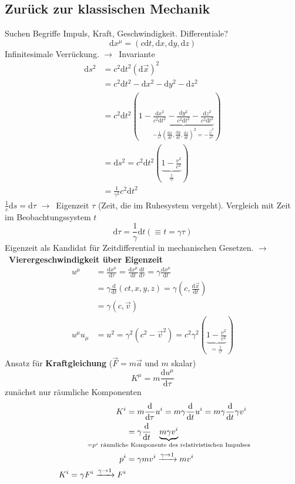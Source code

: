 \documentclass[oneside]{book}
\theoremstyle{definition}
\newcommand{\conseq}{$\rightarrow$~}
\renewcommand{\d}{\mathrm d}
\newcommand{\dd}[1]{\frac{\d}{\d #1}}
\newcommand{\ddd}[2]{\frac{\d #1}{\d #2}}
\begin{document}
\subsection{Zurück zur klassischen Mechanik}
Suchen Begriffe Impuls, Kraft, Geschwindigkeit. Differentiale?
$$\d x^\mu = (c \d t, \d x, \d y, \d z)$$
Infinitesimale Verrückung.
\conseq Invariante
\begin{align*}
 \d s^2  &= c^2 \d t^2 (\d \vec{x})^2\\
 & = c^2 \d t^2 - \d x^2 - \d y^2 - \d z^2\\
 & = c^2 \d t^2 (1 - \underbrace{\frac{\d x^2}{c^2 \d t^2} - \frac{\d y^2}{c^2 \d t^2} - \frac{\d z^2}{c^2 \d t^2}}_{- \frac{1}{c^2} (\ddd x t, \ddd y t, \ddd z t)^2 = - \frac{\vec{v}^2}{c^2}})\\
 & = \d s^2 = c^2 \d t^2 (\underbrace{1 - \frac{v^2}{c^2}}_{\frac{1}{\gamma^2}})\\
 & = \frac{1}{\gamma^2} c^2 \d t^2
\end{align*}
$\frac{1}{c} \d s = \d \tau$ \conseq Eigenzeit $\tau$ (Zeit, die im Ruhesystem vergeht).
Vergleich mit Zeit im Beobachtungssystem $t$
$$\d \tau = \frac{1}{\gamma} \d t (\equiv t = \gamma \tau)$$
Eigenzeit als Kandidat für Zeitdifferential in mechanischen Gesetzen.
\conseq \textbf{Vierergeschwindigkeit über Eigenzeit}
\begin{align*}
	u^\mu &= \ddd{x^\mu}{\tau} = \ddd{x^\mu}{t} \ddd t \tau = \gamma \ddd{x^\mu}{t}\\
	&= \gamma \dd t (c t, x, y, z) = \gamma (c, \ddd{\vec{x}}{t})\\
	&= \gamma (c, \vec{v})\\
	u^\mu u_\mu &= u^2 = \gamma^2 (c^2 - \vec{v}^2) = c^2 \gamma^2 (\underbrace{1 - \frac{v^2}{c^2}}_{= \frac{1}{\gamma^2}})
\end{align*}
Ansatz für \textbf{Kraftgleichung} ($\vec{F} = m \vec{a}$ und $m$ skalar)
$$K^\mu = m \ddd{u^\mu}{\tau}$$
zunächst nur räumliche Komponenten
\begin{align*}
	K^i &= m \dd \tau u^i = m \gamma \dd t u^i = m \gamma \dd t \gamma v^i\\
	&= \gamma \dd t \underbrace{m \gamma v^i}_{\text{\hspace{-10em}}= p^i \text{~räumliche Komponente des relativistischen Impulses}\text{\hspace{-10em}}}\\
	p^i &= \gamma m v^i \xrightarrow{\gamma \to 1} m v^i\\
	K^i = \gamma F^i \xrightarrow{\gamma \to 1} F^i
\end{align*}
\end{document}
